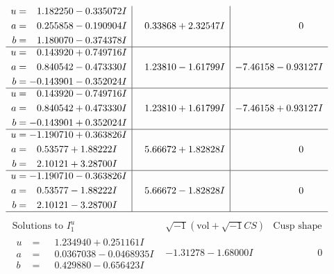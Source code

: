 \documentclass[1p]{elsarticle_modified}
\theoremstyle{definition}
\newcommand{\I}{\sqrt{-1}}
\begin{document}
$$\begin{array}{c|c|c}
\begin{aligned}
u &= \phantom{-}1.182250 - 0.335072 I \\
a &= \phantom{-}0.255858 - 0.190904 I \\
b &= \phantom{-}1.180070 - 0.374378 I\end{aligned}
 & \phantom{-}0.33868 + 2.32547 I & \phantom{-0.000000 } 0 \\ \hline\begin{aligned}
u &= \phantom{-}0.143920 + 0.749716 I \\
a &= \phantom{-}0.840542 - 0.473330 I \\
b &= -0.143901 - 0.352024 I\end{aligned}
 & \phantom{-}1.23810 - 1.61799 I & -7.46158 - 0.93127 I \\ \hline\begin{aligned}
u &= \phantom{-}0.143920 - 0.749716 I \\
a &= \phantom{-}0.840542 + 0.473330 I \\
b &= -0.143901 + 0.352024 I\end{aligned}
 & \phantom{-}1.23810 + 1.61799 I & -7.46158 + 0.93127 I \\ \hline\begin{aligned}
u &= -1.190710 + 0.363826 I \\
a &= \phantom{-}0.53577 + 1.88222 I \\
b &= \phantom{-}2.10121 + 3.28700 I\end{aligned}
 & \phantom{-}5.66672 + 1.82828 I & \phantom{-0.000000 } 0 \\ \hline\begin{aligned}
u &= -1.190710 - 0.363826 I \\
a &= \phantom{-}0.53577 - 1.88222 I \\
b &= \phantom{-}2.10121 - 3.28700 I\end{aligned}
 & \phantom{-}5.66672 - 1.82828 I & \phantom{-0.000000 } 0\\
 \hline 
 \end{array}$$\newpage$$\begin{array}{c|c|c}  
\text{Solutions to }I^u_{1}& \I (\text{vol} + \sqrt{-1}CS) & \text{Cusp shape}\\
 \hline 
\begin{aligned}
u &= \phantom{-}1.234940 + 0.251161 I \\
a &= \phantom{-}0.0367038 - 0.0468935 I \\
b &= \phantom{-}0.429880 - 0.656423 I\end{aligned}
 & -1.31278 - 1.68000 I & \phantom{-0.000000 } 0 \\ \hline\begin{aligned}

\end{aligned}
\end{array}$$
\end{document}
